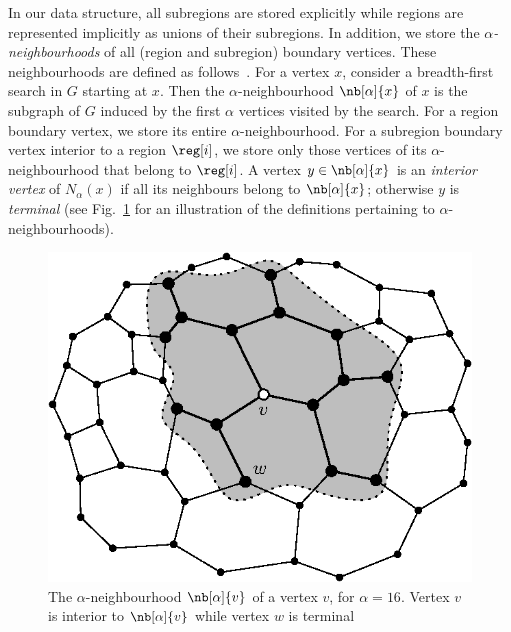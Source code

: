 {In our data structure, all subregions are stored explicitly while
regions are represented implicitly as unions of their subregions.
In addition, we store the \emph{$\alpha$-neighbourhoods} of all (region
and subregion) boundary vertices.
These neighbourhoods are defined
as follows~\cite{DBLP:conf/soda/AgarwalAMVV98}.
For a vertex $x$, consider a breadth-first search in $G$ starting at $x$.
Then the $\alpha$-neighbourhood $\nb[\alpha]{x}$ of $x$ is the subgraph of $G$
induced by the first $\alpha$ vertices visited by the search.
For a region boundary vertex, we store its entire $\alpha$-neighbourhood.
For a subregion boundary vertex interior to a region $\reg[i]$, we store
only those vertices of its $\alpha$-neighbourhood that belong to
$\reg[i]$.
A vertex $y \in \nb[\alpha]{x}$ is an \emph{interior vertex} of
$N_\alpha(x)$ if all its neighbours belong to $\nb[\alpha]{x}$;
otherwise $y$ is \emph{terminal}
(see Fig.~\ref{fig:alpha_neighbourhoods} for an illustration of the
definitions pertaining to $\alpha$-neighbourhoods).

\begin{figure}[t]
  \centering
  \includegraphics{Fig2}
  \caption[$\alpha$-neighbourhood of a boundary vertex]{The 
	$\alpha$-neighbourhood $\nb[\alpha]{v}$ of a vertex $v$,
    for $\alpha = 16$.
    Vertex $v$ is interior to $\nb[\alpha]{v}$ while vertex $w$ is terminal}
  \label{fig:alpha_neighbourhoods}
\end{figure}

}
